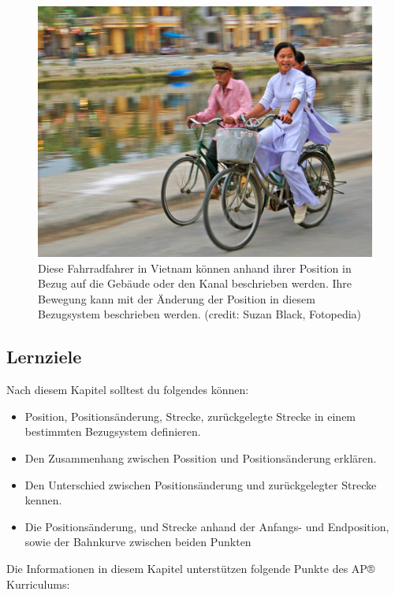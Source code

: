 \documentclass[
]{book}
\providecommand{\tightlist}{%
  \setlength{\itemsep}{0pt}\setlength{\parskip}{0pt}}
\begin{document}
\begin{figure}
\hypertarget{import-auto-id2723149}{%
\centering
\includegraphics{images/Figure_02_01_00.jpg}
\caption{Diese Fahrradfahrer in Vietnam können anhand ihrer Position in Bezug auf die Gebäude oder den Kanal beschrieben werden. Ihre Bewegung kann mit der Änderung der Position in diesem Bezugsystem beschrieben werden. (credit: Suzan
Black, Fotopedia)}\label{import-auto-id2723149}
}
\end{figure}

\hypertarget{fs-id3277370}{}
\hypertarget{lernziele}{%
\subsection{Lernziele}\label{lernziele}}

Nach diesem Kapitel solltest du folgendes können:

\begin{itemize}
\tightlist
\item
  Position, Positionsänderung, Strecke, zurückgelegte Strecke in einem bestimmten Bezugsystem definieren.
\item
  Den Zusammenhang zwischen Possition und Positionsänderung erklären.
\item
  Den Unterschied zwischen Positionsänderung und zurückgelegter Strecke kennen.
\item
  Die Positionsänderung, und Strecke anhand der Anfangs- und Endposition, sowie der Bahnkurve zwischen beiden Punkten
\end{itemize}

Die Informationen in diesem Kapitel unterstützen folgende Punkte des AP® Kurriculums:
\end{document}
